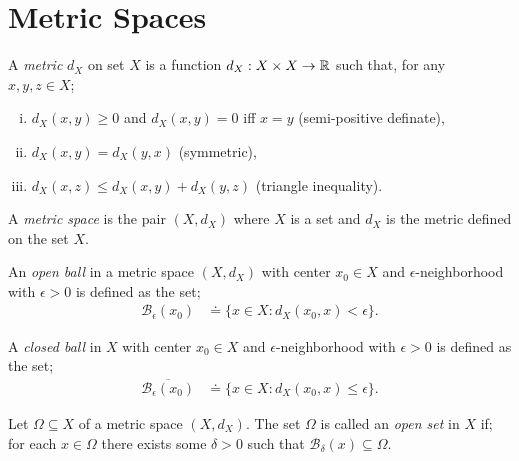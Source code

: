 
\section{Metric Spaces} %
\label{sec:metricspaces}

\begin{defn}[Metric]
  A \emph{metric} $d_X$ on set $X$ is a function
  $d_X : X \times X \to \mathbb{R}$ such that, for any $x,y,z \in X$;
  \begin{enumerate}[i.)]
      \item $d_X (x,y) \geq 0$ and $d_X (x,y)=0$ iff $x=y$ (semi-positive definate),
      \item $d_X (x,y)=d_X (y,x)$ (symmetric),
      \item $d_X (x,z) \leq d_X (x,y) + d_X (y,z)$ (triangle inequality).
  \end{enumerate}
\end{defn}

\begin{defn}
  A \emph{metric space} is the pair $(X, d_X)$ where $X$ is a set
  and $d_X$ is the metric defined on the set $X$.
\end{defn}


\begin{defn}
  An \emph{open ball} in a metric space $(X,d_X)$ with center
  $x_0 \in X$ and $\epsilon$-neighborhood with $\epsilon > 0$ is defined as the set;
  \begin{align*}
    \mathcal{B}_{\epsilon}(x_0) & \doteq
    \{ x \in X : d_X(x_0,x) < \epsilon \}.
  \end{align*}
\end{defn}

\begin{defn}
  A \emph{closed ball} in $X$ with center $x_0 \in X$ and
  $\epsilon$-neighborhood with $\epsilon > 0$ is defined as the set;
  \begin{align*}
    \overline{\mathcal{B}_{\epsilon}(x_0)} & \doteq
    \{ x \in X : d_X(x_0,x) \leq \epsilon \}.
  \end{align*}
\end{defn}

\begin{defn}
  Let $\Omega \subseteq X$ of a metric space $(X,d_X)$. The set $\Omega$ is called
  an \emph{open set} in $X$ if; for each $x \in \Omega$ there exists
  some $\delta>0$ such that $\mathcal{B}_{\delta}(x) \subseteq \Omega$.
\end{defn}

